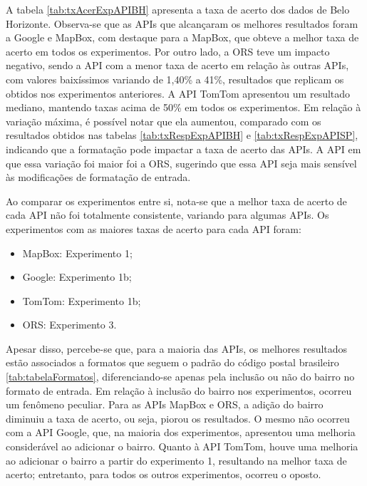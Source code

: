 A tabela \ref{tab:txAcerExpAPIBH} apresenta a taxa de acerto dos dados de Belo Horizonte. Observa-se que as APIs que alcançaram os melhores resultados foram a Google e MapBox, com destaque para a MapBox, que obteve a melhor taxa de acerto em todos os experimentos. Por outro lado, a ORS teve um impacto negativo, sendo a API com a menor taxa de acerto em relação às outras APIs, com valores baixíssimos variando de 1,40\% a 41\%, resultados que replicam os obtidos nos experimentos anteriores. A API TomTom apresentou um resultado mediano, mantendo taxas acima de 50\% em todos os experimentos. Em relação à variação máxima, é possível notar que ela aumentou, comparado com os resultados obtidos nas tabelas \ref{tab:txRespExpAPIBH} e \ref{tab:txRespExpAPISP}, indicando que a formatação pode impactar a taxa de acerto das APIs. A API em que essa variação foi maior foi a ORS, sugerindo que essa API seja mais sensível às modificações de formatação de entrada.

Ao comparar os experimentos entre si, nota-se que a melhor taxa de acerto de cada API não foi totalmente consistente, variando para algumas APIs. Os experimentos com as maiores taxas de acerto para cada API foram:
\begin{itemize}
  \item MapBox: Experimento 1;
  \item Google: Experimento 1b;
  \item TomTom: Experimento 1b;
  \item ORS: Experimento 3.
\end{itemize} 

Apesar disso, percebe-se que, para a maioria das APIs, os melhores resultados estão associados a formatos que seguem o padrão do código postal brasileiro \ref{tab:tabelaFormatos}, diferenciando-se apenas pela inclusão ou não do bairro no formato de entrada. Em relação à inclusão do bairro nos experimentos, ocorreu um fenômeno peculiar. Para as APIs MapBox e ORS, a adição do bairro diminuiu a taxa de acerto, ou seja, piorou os resultados. O mesmo não ocorreu com a API Google, que, na maioria dos experimentos, apresentou uma melhoria considerável ao adicionar o bairro. Quanto à API TomTom, houve uma melhoria ao adicionar o bairro a partir do experimento 1, resultando na melhor taxa de acerto; entretanto, para todos os outros experimentos, ocorreu o oposto.

